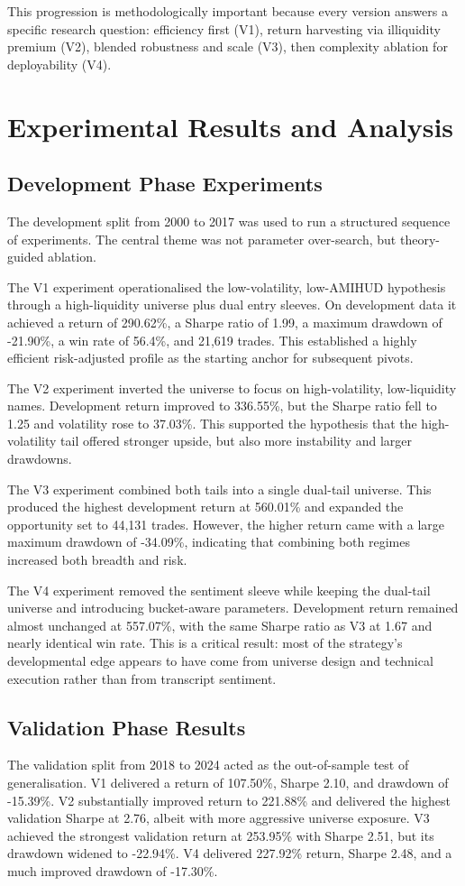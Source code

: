 \documentclass[11pt,twoside,a4paper]{article}
\begin{document}
This progression is methodologically important because every version answers a specific research question: efficiency first (V1), return harvesting via illiquidity premium (V2), blended robustness and scale (V3), then complexity ablation for deployability (V4).

\section{Experimental Results and Analysis}
\subsection*{Development Phase Experiments}
The development split from 2000 to 2017 was used to run a structured sequence of experiments. The central theme was not parameter over-search, but theory-guided ablation.

The V1 experiment operationalised the low-volatility, low-AMIHUD hypothesis through a high-liquidity universe plus dual entry sleeves. On development data it achieved a return of 290.62\%, a Sharpe ratio of 1.99, a maximum drawdown of -21.90\%, a win rate of 56.4\%, and 21,619 trades. This established a highly efficient risk-adjusted profile as the starting anchor for subsequent pivots.

The V2 experiment inverted the universe to focus on high-volatility, low-liquidity names. Development return improved to 336.55\%, but the Sharpe ratio fell to 1.25 and volatility rose to 37.03\%. This supported the hypothesis that the high-volatility tail offered stronger upside, but also more instability and larger drawdowns.

The V3 experiment combined both tails into a single dual-tail universe. This produced the highest development return at 560.01\% and expanded the opportunity set to 44,131 trades. However, the higher return came with a large maximum drawdown of -34.09\%, indicating that combining both regimes increased both breadth and risk.

The V4 experiment removed the sentiment sleeve while keeping the dual-tail universe and introducing bucket-aware parameters. Development return remained almost unchanged at 557.07\%, with the same Sharpe ratio as V3 at 1.67 and nearly identical win rate. This is a critical result: most of the strategy's developmental edge appears to have come from universe design and technical execution rather than from transcript sentiment.

\subsection*{Validation Phase Results}
The validation split from 2018 to 2024 acted as the out-of-sample test of generalisation. V1 delivered a return of 107.50\%, Sharpe 2.10, and drawdown of -15.39\%. V2 substantially improved return to 221.88\% and delivered the highest validation Sharpe at 2.76, albeit with more aggressive universe exposure. V3 achieved the strongest validation return at 253.95\% with Sharpe 2.51, but its drawdown widened to -22.94\%. V4 delivered 227.92\% return, Sharpe 2.48, and a much improved drawdown of -17.30\%.
\end{document}
